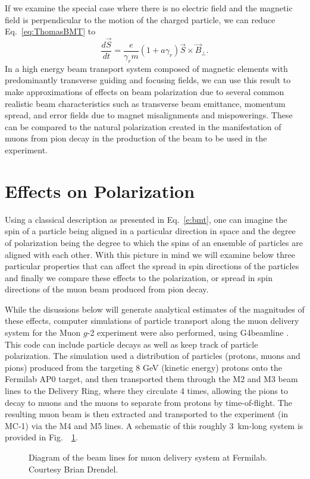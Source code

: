 \documentclass[12pt]{article}
\begin{document}
If we examine the special case where there is no electric field and the magnetic field is perpendicular to the motion of the charged particle, we can reduce Eq.~\ref{eq:ThomasBMT} to
\begin{equation}
\frac{d \vec{S}}{dt} = \frac{e}{\gamma_r m} (1 + a \gamma_r) \vec{S} \times \vec{B}_{\perp}. \label{e:bmt}
\end{equation}
In a high energy beam transport system composed of magnetic elements with predominantly transverse guiding and focusing fields, we can use this result to make approximations of effects on beam polarization due to several common realistic beam characteristics such as transverse beam emittance, momentum spread, and error fields due to magnet misalignments and mispowerings.  These can be compared to the natural polarization created in the manifestation of muons from pion decay in the production of the beam to be used in the experiment.

\section{Effects on Polarization}

Using a classical description as presented in Eq.~\ref{e:bmt}, one can imagine the spin of a particle being aligned in a particular direction in space and the degree of polarization being the degree to which the spins of an ensemble of particles are aligned with each other.  With this picture in mind we will examine below three particular properties that can affect the spread in spin directions of the particles and finally we compare these effects to the polarization, or spread in spin directions of the muon beam produced from pion decay. 

While the disussions below will generate analytical estimates of the magnitudes of these effects, computer simulations of particle transport along the muon delivery system for the Muon $g$-2 experiment were also performed, using G4beamline \cite{Roberts}.  This code can include particle decays as well as keep track of particle polarization. The simulation used a distribution of particles (protons, muons and pions) produced from the targeting 8 GeV (kinetic energy) protons onto the Fermilab AP0 target, and then transported them through the M2 and M3 beam lines to the Delivery Ring, where they circulate 4 times, allowing the pions to decay to muons and the muons to separate from protons by time-of-flight. The resulting muon beam is then extracted and transported to the experiment (in MC-1) via the M4 and M5 lines.   A schematic of this roughly 3~km-long system is provided in Fig.~\ \ref{fig:Beamlines}.
\begin{figure}[htb]
\begin{center}
\caption{Diagram of the beam lines for muon delivery system at Fermilab. Courtesy Brian Drendel.}
\label{fig:Beamlines}
\end{center}
\end{figure}
\end{document}

